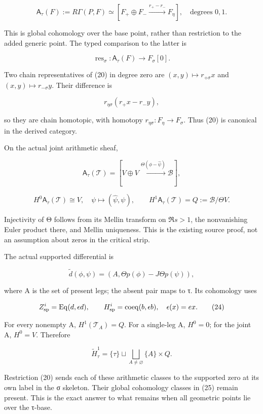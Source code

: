 \[
\mathsf A_\tau(F):=R\Gamma(P,F)
\simeq[F_+\oplus F_-\xrightarrow{r_+-r_-}F_\eta],
\quad\text{degrees }0,1.
\tag{19}
\]

This is global cohomology over the base point, rather than restriction to the added generic point. The typed comparison to the latter is

\[
\operatorname{res}_\sigma:\mathsf A_\tau(F)\longrightarrow F_\sigma[0].
\tag{20}
\]

Two chain representatives of (20) in degree zero are \((x,y)\mapsto r_{+\sigma}x\) and \((x,y)\mapsto r_{-\sigma}y\). Their difference is

\[
r_{\eta\sigma}(r_+x-r_-y),
\]

so they are chain homotopic, with homotopy \(r_{\eta\sigma}:F_\eta\to F_\sigma\). Thus (20) is canonical in the derived category.

On the actual joint arithmetic sheaf,

\[
\mathsf A_\tau(\mathcal T)
=[V\oplus V\xrightarrow{\Theta(\phi-\widehat\psi)}\mathscr B],
\tag{21}
\]

\[
H^0\mathsf A_\tau(\mathcal T)\cong V,
\quad \psi\mapsto(\widehat\psi,\psi),
\qquad
H^1\mathsf A_\tau(\mathcal T)=Q:=\mathscr B/\Theta V.
\tag{22}
\]

Injectivity of Θ follows from its Mellin transform on \(\Re s>1\), the nonvanishing Euler product there, and Mellin uniqueness. This is the existing source proof, not an assumption about zeros in the critical strip.

The actual supported differential is

\[
\widetilde d(\phi,\psi)
=(A,\Theta p(\phi)-J\Theta p(\psi)),
\tag{23}
\]

where A is the set of present legs; the absent pair maps to τ. Its cohomology uses

\[
Z^i_{\rm sp}=\operatorname{Eq}(d,\epsilon d),
\qquad
H^i_{\rm sp}=\operatorname{coeq}(b,\epsilon b),
\quad\epsilon(x)=ex.
\tag{24}
\]

For every nonempty A, \(H^1(\mathcal T_A)=Q\). For a single-leg A, \(H^0=0\); for the joint A, \(H^0=V\). Therefore

\[
\widetilde H^1_\tau
=\{\tau\}\sqcup\bigsqcup_{A\ne\varnothing}\{A\}\times Q.
\tag{25}
\]

Restriction (20) sends each of these arithmetic classes to the supported zero at its own label in the σ skeleton. Their global cohomology classes in (25) remain present. This is the exact answer to what remains when all geometric points lie over the τ-base.

